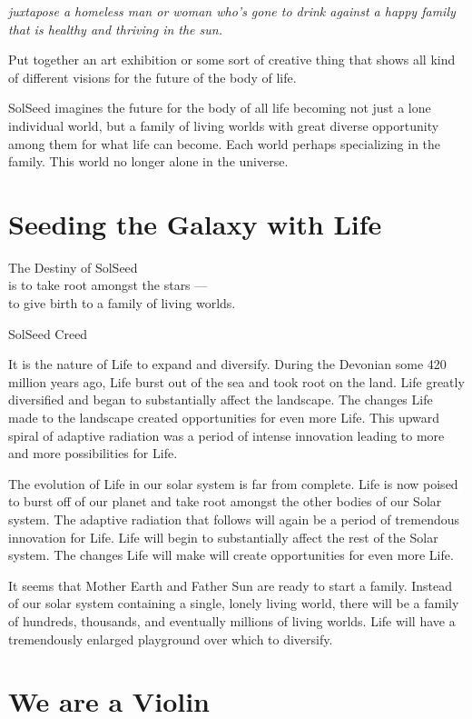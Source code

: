 \documentclass[ebook,12pt,openany,twoside]{memoir}
\newcommand{\tab}{\hspace*{2em}}
\newcommand{\imagefacingchapter}[1]{
  \cleartoverso
  \clearpage \null
  \thispagestyle{cleared}
  \AddToShipoutPictureBG*{%
    \AtStockLowerLeft{%
      \texttt{[image: \#1]}
    }
  }
  \clearpage
}
\begin{document}
{
\em
juxtapose a homeless man or woman who's gone to drink against a happy family
that is healthy and thriving in the sun.

Put together an art exhibition or some sort of creative thing that shows all
kind of different visions for the future of the body of life.

SolSeed imagines the future for the body of all life becoming not just a lone
individual world, but a family of living worlds with great diverse opportunity
among them for what life can become. Each world perhaps specializing in the
family. This world no longer alone in the universe.
}

\imagefacingchapter{images/MotherEarthFatherSun}
\chapter{Seeding the Galaxy with Life}

\setlength\epigraphwidth{3.0in}
\epigraph{
  The Destiny of SolSeed\\
  is to take root amongst the stars ---\\
  \tab to give birth to a family of living worlds.
}{SolSeed Creed}

\noindent It is the nature of Life to expand and diversify. During the Devonian
some 420 million years ago, Life burst out of the sea and took root on the
land. Life greatly diversified and began to substantially affect the landscape.
The changes Life made to the landscape created opportunities for even more
Life. This upward spiral of adaptive radiation was a period of intense
innovation leading to more and more possibilities for Life.

The evolution of Life in our solar system is far from complete. Life is now
poised to burst off of our planet and take root amongst the other bodies of our
Solar system. The adaptive radiation that follows will again be a period of
tremendous innovation for Life. Life will begin to substantially affect the
rest of the Solar system. The changes Life will make will create opportunities
for even more Life.

It seems that Mother Earth and Father Sun are ready to start a family. Instead
of our solar system containing a single, lonely living world, there will be a
family of hundreds, thousands, and eventually millions of living worlds. Life
will have a tremendously enlarged playground over which to diversify.

\imagefacingchapter{images/ViolinMaker-cropped}
\chapter{We are a Violin}
\end{document}
